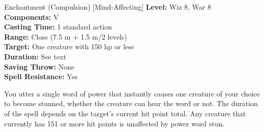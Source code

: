 {Enchantment (Compulsion) [Mind-Affecting]}
{
	\textbf{Level:}
	Wiz 8, War 8\\
	\textbf{Components:}
	V\\
	\textbf{Casting Time:}
	1 standard action\\
	\textbf{Range:}
	Close (7.5 m + 1.5 m/2 levels)\\
	\textbf{Target:}
	One creature with 150 hp or less\\
	\textbf{Duration:}
	See text\\
	\textbf{Saving Throw:}
	None\\
	\textbf{Spell Resistance:}
	Yes\\
}
{

	You utter a single word of power that instantly causes one creature of your choice to become stunned, whether the creature can hear the word or not. The duration of the spell depends on the target's current hit point total. Any creature that currently has 151 or more hit points is unaffected by power word stun.

}
